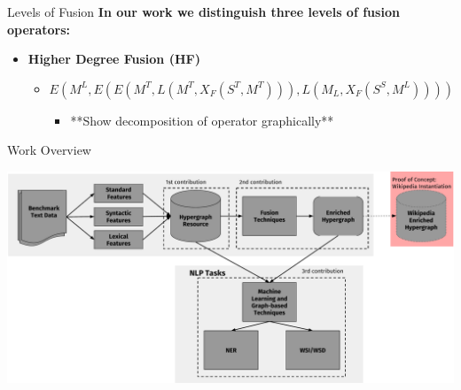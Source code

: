 \documentclass[10pt,xcolor=table]{beamer}
\begin{document}
\begin{frame}[t]{Levels of Fusion}
\large \textbf{In our work we distinguish three levels of fusion operators:} 
\vspace{.5cm}
\begin{itemize}
\item  \textbf{Higher Degree Fusion (HF)}
	\begin{itemize}
	\item $E(M^L , E(E(M^T , L(M^T , X_F (S^T , M^T ))) , L(M_L , X_F (S^S , M^L ))))$
		\begin{itemize}
			\item **Show decomposition of operator graphically**
			
		\end{itemize}
	\end{itemize}
\end{itemize}
\end{frame}


\begin{frame}{Work Overview}
\begin{center}
\includegraphics[width=1.04\linewidth]{image2/Chapitre3/main_diag_presi_contri2_1.pdf}
\end{center}

 \vspace{\textheight}
\end{frame} 
\end{document}
